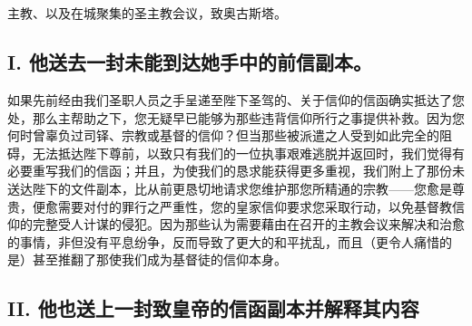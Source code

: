 

\section{}

主教、以及在城聚集的圣主教会议，致奥古斯塔。\par


\subsection{I. 他送去一封未能到达她手中的前信副本。}

如果先前经由我们圣职人员之手呈递至陛下圣驾的、关于信仰的信函确实抵达了您处，那么主帮助之下，您无疑早已能够为那些违背信仰所行之事提供补救。因为您何时曾辜负过司铎、宗教或基督的信仰？但当那些被派遣之人受到如此完全的阻碍，无法抵达陛下尊前，以致只有我们的一位执事艰难逃脱并返回时，我们觉得有必要重写我们的信函；并且，为使我们的恳求能获得更多重视，我们附上了那份未送达陛下的文件副本，比从前更恳切地请求您维护那您所精通的宗教——您愈是尊贵，便愈需要对付的罪行之严重性，您的皇家信仰要求您采取行动，以免基督教信仰的完整受人计谋的侵犯。因为那些认为需要藉由在召开的主教会议来解决和治愈的事情，非但没有平息纷争，反而导致了更大的和平扰乱，而且（更令人痛惜的是）甚至推翻了那使我们成为基督徒的信仰本身。\par


\subsection{II. 他也送上一封致皇帝的信函副本并解释其内容}

